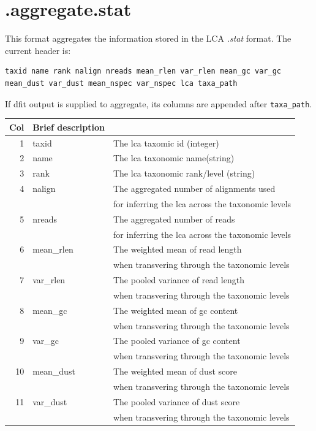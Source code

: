 \documentclass[10pt]{article}
\begin{document}
\section{.aggregate.stat}
This format aggregates the information stored in the LCA \textit{.stat} format.
The current header is:
\begin{verbatim}
taxid name rank nalign nreads mean_rlen var_rlen mean_gc var_gc
mean_dust var_dust mean_nspec var_nspec lca taxa_path
\end{verbatim}
If dfit output is supplied to aggregate, its columns are appended after
\texttt{taxa\_path}. 
\begin{table}[h]
\begin{tabular}{rll}
  \hline
  {\bf Col} & {\bf Brief description} \\
  \hline
  1 & {\sf taxid} & The lca taxomic id (integer)\\
  2 & {name} & The lca taxonomic name(string)\\
  3 & {rank} & The lca taxonomic rank/level (string)\\
  4 & {nalign} & The aggregated number of alignments used \\ & & for inferring the lca across the taxonomic levels\\
  5 & {nreads} & The aggregated number of reads \\ & & for inferring the lca across the taxonomic levels\\
  6 & {mean\_rlen} & The weighted mean of read length \\ & & when transvering through the taxonomic levels\\
  7 & {var\_rlen} & The pooled variance of read length \\ & & when transvering through the taxonomic levels\\
  8 & {mean\_gc} & The weighted mean of gc content \\ & & when transvering through the taxonomic levels\\
  9 & {var\_gc} & The pooled variance of gc content \\ & & when transvering through the taxonomic levels\\
  10 & {mean\_dust} & The weighted mean of dust score \\ & & when transvering through the taxonomic levels\\
  11 & {var\_dust} & The pooled variance of dust score \\ & & when transvering through the taxonomic levels\\

\end{tabular}
\end{table}
\end{document}
